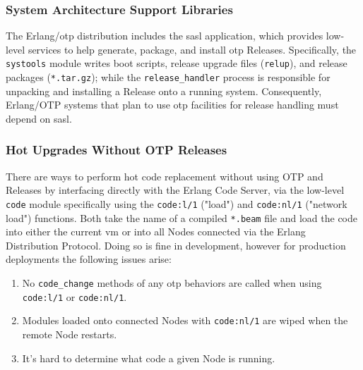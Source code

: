 \subsubsection{System Architecture Support Libraries}

The Erlang/\acrshort{otp} distribution includes the \acrfull{sasl} application, which provides low-level services to help generate, package, and install \acrshort{otp} Releases. Specifically, the \lstinline|systools| module writes boot scripts, release upgrade files (\lstinline|relup|), and release packages (\lstinline|*.tar.gz|); while the \lstinline|release_handler| process is responsible for unpacking and installing a Release onto a running system. Consequently, Erlang/OTP systems that plan to use \acrshort{otp} facilities for release handling must depend on \acrshort{sasl}.


\subsubsection{Hot Upgrades Without OTP Releases}

There are ways to perform hot code replacement without using OTP and Releases by interfacing directly with the Erlang Code Server, via the low-level \lstinline|code| module specifically using the \lstinline|code:l/1| ("load") and \lstinline|code:nl/1| ("network load") functions. Both take the name of a compiled \lstinline|*.beam| file and load the code into either the current \acrshort{vm} or into all Nodes connected via the Erlang Distribution Protocol. Doing so is fine in development, however for production deployments the following issues arise:

\begin{enumerate}
\item No \lstinline|code_change| methods of any \acrshort{otp} behaviors are called when using \lstinline|code:l/1| or \lstinline|code:nl/1|.
\item Modules loaded onto connected Nodes with \lstinline|code:nl/1| are wiped when the remote Node restarts.
\item It's hard to determine what code a given Node is running.
\end{enumerate}

